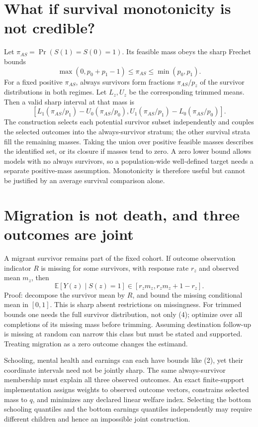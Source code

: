 \documentclass[11pt]{article}
\theoremstyle{definition}
\newcommand{\E}{\mathbb E}
\begin{document}
\section*{What if survival monotonicity is not credible?}
Let $\pi_{AS}=\Pr(S(1)=S(0)=1)$. Its feasible mass obeys the sharp Frechet
bounds
\[
 \max(0,p_0+p_1-1)\le\pi_{AS}\le\min(p_0,p_1).
\]
For a fixed positive $\pi_{AS}$, always survivors form fractions
$\pi_{AS}/p_z$ of the survivor distributions in both regimes. Let $L_z,U_z$
be the corresponding trimmed means. Then a valid sharp interval at that mass is
\[
 [L_1(\pi_{AS}/p_1)-U_0(\pi_{AS}/p_0),
   U_1(\pi_{AS}/p_1)-L_0(\pi_{AS}/p_0)].                \tag{3}
\]
The construction selects each potential survivor subset independently and
couples the selected outcomes into the always-survivor stratum; the other
survival strata fill the remaining masses. Taking the union over positive
feasible masses describes the identified set, or its closure if masses tend
to zero. A zero lower bound allows models with no always survivors, so a
population-wide well-defined target needs a separate positive-mass assumption.
Monotonicity is therefore useful but cannot be justified by an average survival
comparison alone.

\section*{Migration is not death, and three outcomes are joint}
A migrant survivor remains part of the fixed cohort. If outcome observation
indicator $R$ is missing for some survivors, with response rate $r_z$ and
observed mean $m_z$, then
\[
 \E[Y(z)\mid S(z)=1]\in[r_z m_z,r_z m_z+1-r_z].          \tag{4}
\]
Proof: decompose the survivor mean by $R$, and bound the missing conditional
mean in $[0,1]$. This is sharp absent restrictions on missingness. For trimmed
bounds one needs the full survivor distribution, not only (4); optimize over
all completions of its missing mass before trimming. Assuming destination
follow-up is missing at random can narrow this class but must be stated and
supported. Treating migration as a zero outcome changes the estimand.

Schooling, mental health and earnings can each have bounds like (2), yet their
coordinate intervals need not be jointly sharp. The same always-survivor
membership must explain all three observed outcomes. An exact finite-support
implementation assigns weights to observed outcome vectors, constrains selected
mass to $q$, and minimizes any declared linear welfare index. Selecting the
bottom schooling quantiles and the bottom earnings quantiles independently may
require different children and hence an impossible joint construction.
\end{document}
